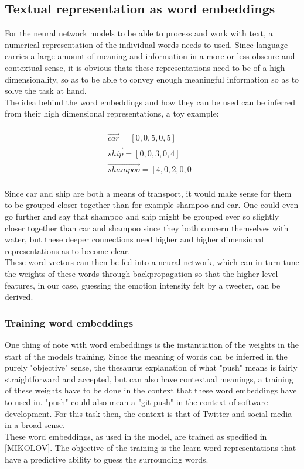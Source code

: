 \subsection{Textual representation as word embeddings}
For the neural network models to be able to process and work with text, a numerical representation of the individual words needs to used. Since language carries a large amount of meaning and information in a more or less obscure and contextual sense, it is obvious thats these representations need to be of a high dimensionality, so as to be able to convey enough meaningful information so as to solve the task at hand.\\
The idea behind the word embeddings and how they can be used can be inferred from their high dimensional representations, a toy example:\\
\\
\begin{equation}
\begin{aligned}
\vec{car} = [0,0,5,0,5]\\
\vec{ship} = [0,0,3,0,4]\\
\vec{shampoo} = [4,0,2,0,0]
\end{aligned}
\end{equation}\\
Since car and ship are both a means of transport, it would make sense for them to be grouped closer together than for example shampoo and car. One could even go further and say that shampoo and ship might be grouped ever so slightly closer together than car and shampoo since they both concern themselves with water, but these deeper connections need higher and higher dimensional representations as to become clear.\\
These word vectors can then be fed into a neural network, which can in turn tune the weights of these words through backpropagation so that the higher level features, in our case, guessing the emotion intensity felt by a tweeter, can be derived.

\subsubsection{Training word embeddings}
One thing of note with word embeddings is the instantiation of the weights in the start of the models training. Since the meaning of words can be inferred in the purely "objective" sense, the thesaurus explanation of what "push" means is fairly straightforward and accepted, but can also have contextual meanings, a training of these weights have to be done in the context that these word embeddings have to used in. "push" could also mean a "git push" in the context of software development. For this task then, the context is that of Twitter and social media in a broad sense.\\
These word embeddings, as used in the model, are trained as specified in [MIKOLOV]. The objective of the training is the learn word representations that have a predictive ability to guess the surrounding words. 

